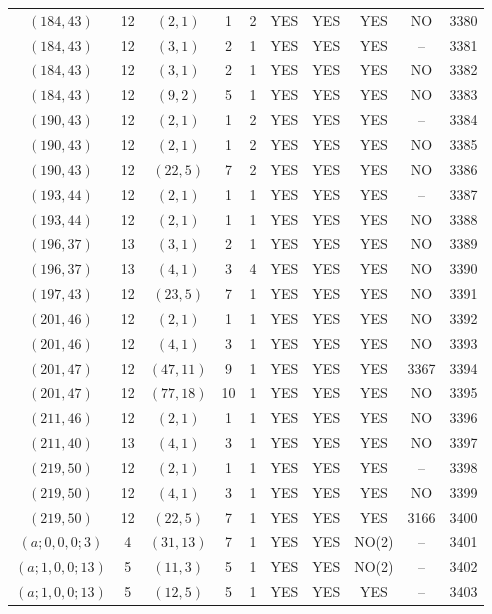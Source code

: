 \begin{longtable}{|c|c|c|c|c|c|c|c|c|c|}
$(184, 43)$ & 12 & $(2, 1)$ & 1 & 2 & YES & YES & YES & NO & 3380\\
$(184, 43)$ & 12 & $(3, 1)$ & 2 & 1 & YES & YES & YES & -- & 3381\\
$(184, 43)$ & 12 & $(3, 1)$ & 2 & 1 & YES & YES & YES & NO & 3382\\
$(184, 43)$ & 12 & $(9, 2)$ & 5 & 1 & YES & YES & YES & NO & 3383\\
$(190, 43)$ & 12 & $(2, 1)$ & 1 & 2 & YES & YES & YES & -- & 3384\\
$(190, 43)$ & 12 & $(2, 1)$ & 1 & 2 & YES & YES & YES & NO & 3385\\
$(190, 43)$ & 12 & $(22, 5)$ & 7 & 2 & YES & YES & YES & NO & 3386\\
$(193, 44)$ & 12 & $(2, 1)$ & 1 & 1 & YES & YES & YES & -- & 3387\\
$(193, 44)$ & 12 & $(2, 1)$ & 1 & 1 & YES & YES & YES & NO & 3388\\
$(196, 37)$ & 13 & $(3, 1)$ & 2 & 1 & YES & YES & YES & NO & 3389\\
$(196, 37)$ & 13 & $(4, 1)$ & 3 & 4 & YES & YES & YES & NO & 3390\\
$(197, 43)$ & 12 & $(23, 5)$ & 7 & 1 & YES & YES & YES & NO & 3391\\
$(201, 46)$ & 12 & $(2, 1)$ & 1 & 1 & YES & YES & YES & NO & 3392\\
$(201, 46)$ & 12 & $(4, 1)$ & 3 & 1 & YES & YES & YES & NO & 3393\\
$(201, 47)$ & 12 & $(47, 11)$ & 9 & 1 & YES & YES & YES & 3367 & 3394\\
$(201, 47)$ & 12 & $(77, 18)$ & 10 & 1 & YES & YES & YES & NO & 3395\\
$(211, 46)$ & 12 & $(2, 1)$ & 1 & 1 & YES & YES & YES & NO & 3396\\
$(211, 40)$ & 13 & $(4, 1)$ & 3 & 1 & YES & YES & YES & NO & 3397\\
$(219, 50)$ & 12 & $(2, 1)$ & 1 & 1 & YES & YES & YES & -- & 3398\\
$(219, 50)$ & 12 & $(4, 1)$ & 3 & 1 & YES & YES & YES & NO & 3399\\
$(219, 50)$ & 12 & $(22, 5)$ & 7 & 1 & YES & YES & YES & 3166 & 3400\\
$(a; 0, 0, 0; 3)$ & 4 & $(31, 13)$ & 7 & 1 & YES & YES & NO(2) & -- & 3401\\
$(a; 1, 0, 0; 13)$ & 5 & $(11, 3)$ & 5 & 1 & YES & YES & NO(2) & -- & 3402\\
$(a; 1, 0, 0; 13)$ & 5 & $(12, 5)$ & 5 & 1 & YES & YES & YES & -- & 3403\\

\end{longtable}
